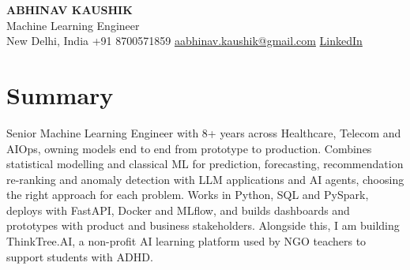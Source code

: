 \documentclass[10pt,a4paper]{article}
\begin{document}
\begin{center}
  {\LARGE\bfseries ABHINAV KAUSHIK}\\[2pt]
  {\large Machine Learning Engineer}\\[2pt]
  New Delhi, India \textbar{} +91 8700571859 \textbar{} \href{mailto:aabhinav.kaushik@gmail.com}{aabhinav.kaushik@gmail.com} \textbar{} \href{https://www.linkedin.com/in/abhinav-kaushik10/}{LinkedIn}  
\end{center}

\section{Summary}
Senior Machine Learning Engineer with 8+ years across Healthcare, Telecom and AIOps, owning models end to end from prototype to production. Combines statistical modelling and classical ML for prediction, forecasting, recommendation re-ranking and anomaly detection with LLM applications and AI agents, choosing the right approach for each problem. Works in Python, SQL and PySpark, deploys with FastAPI, Docker and MLflow, and builds dashboards and prototypes with product and business stakeholders. Alongside this, I am building ThinkTree.AI, a non-profit AI learning platform used by NGO teachers to support students with ADHD.
\end{document}

